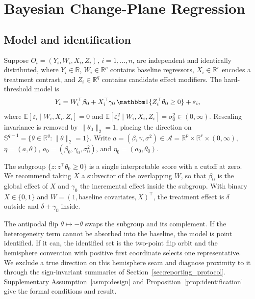 \documentclass[11pt]{article}
\theoremstyle{definition}
\theoremstyle{plain}
\newcommand{\E}{\mathbb{E}}
\newcommand{\R}{\mathbb{R}}
\begin{document}

\section{Bayesian Change-Plane Regression}\label{sec:cp_model}
\subsection{Model and identification}\label{sec:model_identification}

Suppose $O_i=(Y_i,W_i,X_i,Z_i)$, $i=1,\dots,n$, are independent and identically distributed, where $Y_i\in\R$, $W_i\in\R^p$ contains baseline regressors, $X_i\in\R^r$ encodes a treatment contrast, and $Z_i\in\R^q$ contains candidate effect modifiers. The hard-threshold model is
\begin{equation}
Y_i=W_i^\top\beta_0+X_i^\top\gamma_0\,\mathbbm 1\{Z_i^\top\theta_0\ge0\}+\varepsilon_i,
\label{eq:true_dgp}
\end{equation}
where $\E[\varepsilon_i\mid W_i,X_i,Z_i]=0$ and $\E[\varepsilon_i^2\mid W_i,X_i,Z_i]=\sigma_0^2\in(0,\infty)$. Rescaling invariance is removed by $\|\theta_0\|_2=1$, placing the direction on $\mathbb S^{q-1}=\{\theta\in\R^q:\|\theta\|_2=1\}$. Write $a=(\beta,\gamma,\sigma^2)\in\mathcal A=\R^p\times\R^r\times(0,\infty)$, $\eta=(a,\theta)$, $a_0=(\beta_0,\gamma_0,\sigma_0^2)$, and $\eta_0=(a_0,\theta_0)$.

The subgroup $\{z:z^\top\theta_0\ge0\}$ is a single interpretable score with a cutoff at zero. We recommend taking $X$ a subvector of the overlapping $W$, so that $\beta_0$ is the global effect of $X$ and $\gamma_0$ the incremental effect inside the subgroup. With binary $X\in\{0,1\}$ and $W=(1,\text{baseline covariates},X)^\top$, the treatment effect is $\delta$ outside and $\delta+\gamma_0$ inside.

The antipodal flip $\theta\mapsto-\theta$ swaps the subgroup and its complement. If the heterogeneity term cannot be absorbed into the baseline, the model is point identified. If it can, the identified set is the two-point flip orbit and the hemisphere convention with positive first coordinate selects one representative. We exclude a true direction on this hemisphere seam and diagnose proximity to it through the sign-invariant summaries of Section~\ref{sec:reporting_protocol}. Supplementary Assumption~\ref{asmp:design} and Proposition~\ref{prop:identification} give the formal conditions and result.
\end{document}
